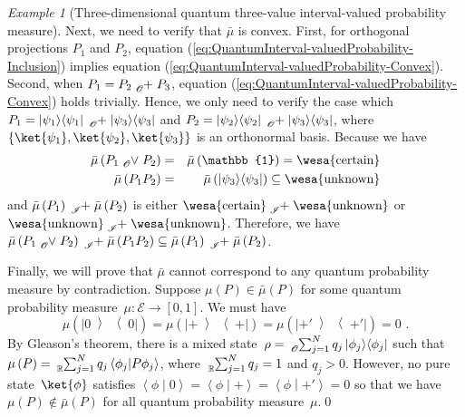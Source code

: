 \documentclass{article}
\theoremstyle{remark}
\newtheorem{example}{Example}
\newcommand{\events}{\ensuremath{\mathcal{E}}}
\newcommand{\ps}{\texttt{+}}
\newcommand{\necess}{{\mbox{\wesa{certain}}}}
\newcommand{\unknown}{{\mbox{\wesa{unknown}}}}
\newcommand{\ip}[2]{\ensuremath{\left\langle{#1}\middle\vert{#2}\right\rangle}}
\newcommand{\op}[2]{\ensuremath{\left\vert{#1}\middle\rangle\middle\langle{#2}\right\vert}}
\newcommand{\proj}[1]{\op{#1}{#1}}
\begin{document}
\begin{example}[Three-dimensional quantum three-value interval-valued
probability measure]
Next, we need to verify that $\bar{\mu}$ is convex. First, for orthogonal
projections $P_{1}$ and $P_{2}$, equation (\ref{eq:QuantumInterval-valuedProbability-Inclusion})
implies equation (\ref{eq:QuantumInterval-valuedProbability-Convex}).
Second, when $P_{1}=P_{2}\tensor*[_{\mathscr{O}}]{+}{}P_{3}$, equation
(\ref{eq:QuantumInterval-valuedProbability-Convex}) holds trivially.
Hence, we only need to verify the case which $P_{1}=\proj{\psi_{1}}\tensor*[_{\mathscr{O}}]{+}{}\proj{\psi_{3}}$
and $P_{2}=\proj{\psi_{2}}\tensor*[_{\mathscr{O}}]{+}{}\proj{\psi_{3}}$,
where $\left\{ \ket{\psi_{1}},\ket{\psi_{2}},\ket{\psi_{3}}\right\} $
is an orthonormal basis. Because we have 
\begin{eqnarray*}
\bar{\mu}\left(P_{1}\tensor*[_{\mathscr{O}}]{\vee}{}P_{2}\right) & = & \bar{\mu}\left(\mathbb{1}\right)=\necess\\
\bar{\mu}\left(P_{1}P_{2}\right) & = & \bar{\mu}\left(\proj{\psi_{3}}\right)\subseteq\unknown
\end{eqnarray*}
and $\bar{\mu}\left(P_{1}\right)\tensor*[_{\mathscr{I}}]{+}{}\bar{\mu}\left(P_{2}\right)$
is either $\necess\tensor*[_{\mathscr{I}}]{+}{}\unknown$ or $\unknown\tensor*[_{\mathscr{I}}]{+}{}\unknown$.
Therefore, we have $\bar{\mu}\left(P_{1}\tensor*[_{\mathscr{O}}]{\vee}{}P_{2}\right)\tensor*[_{\mathscr{I}}]{+}{}\bar{\mu}\left(P_{1}P_{2}\right)\subseteq\bar{\mu}\left(P_{1}\right)\tensor*[_{\mathscr{I}}]{+}{}\bar{\mu}\left(P_{2}\right)$.

Finally, we will prove that $\bar{\mu}$ cannot correspond to any
quantum probability measure by contradiction. Suppose $\mu(P)\in\bar{\mu}(P)$
for some quantum probability measure~$\mu:\events\rightarrow\left[0,1\right]$.
We must have 
\begin{equation}
\mu(\proj{0})=\mu(\proj{\ps})=\mu(\proj{\ps'})=0\textrm{ .}\label{eq:probability-zero-on-states}
\end{equation}
By Gleason's theorem, there is a mixed state~$\rho=\tensor*[_{\mathscr{O}}]{\sum}{_{j=1}^{N}}q_{j}\proj{\phi_{j}}$
such that $\mu\left(P\right)=\tensor*[_{\mathbb{R}}]{\sum}{_{j=1}^{N}}q_{j}\ip{\phi_{j}}{P\phi_{j}}$,
where $\tensor*[_{\mathbb{R}}]{\sum}{_{j=1}^{N}}q_{j}=1$ and $q_{j}>0$.
However, no pure state~$\ket{\phi}$ satisfies $\ip{\phi}{0}=\ip{\phi}{\ps}=\ip{\phi}{\ps'}=0$
so that we have $\mu(P)\notin\bar{\mu}(P)$ for all quantum probability
measure~$\mu$.\qed\end{example}

\end{document}
